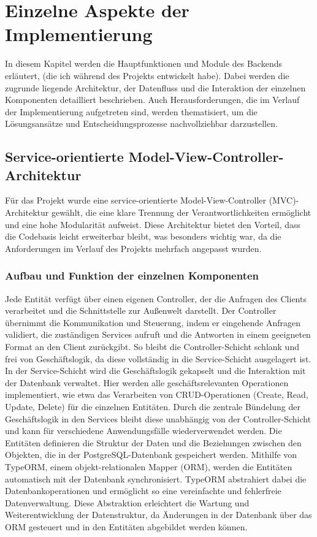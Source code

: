\chapter{Einzelne Aspekte der Implementierung}
In diesem Kapitel werden die Hauptfunktionen und Module des Backends erläutert, (die ich während des Projekts entwickelt habe). Dabei werden die zugrunde liegende Architektur, der Datenfluss und die Interaktion der einzelnen Komponenten detailliert beschrieben. Auch Herausforderungen, die im Verlauf der Implementierung aufgetreten sind, werden thematisiert, um die Lösungsansätze und Entscheidungsprozesse nachvollziehbar darzustellen.
\section{Service-orientierte Model-View-Controller-Architektur}
Für das Projekt wurde eine service-orientierte Model-View-Controller (MVC)-Architektur gewählt, die eine klare Trennung der Verantwortlichkeiten ermöglicht und eine hohe Modularität aufweist. Diese Architektur bietet den Vorteil, dass die Codebasis leicht erweiterbar bleibt, was besonders wichtig war, da die Anforderungen im Verlauf des Projekts mehrfach angepasst wurden.
\subsection*{Aufbau und Funktion der einzelnen Komponenten}
Jede Entität verfügt über einen eigenen Controller, der die Anfragen des Clients verarbeitet und die Schnittstelle zur Außenwelt darstellt. Der Controller übernimmt die Kommunikation und Steuerung, indem er eingehende Anfragen validiert, die zuständigen Services aufruft und die Antworten in einem geeigneten Format an den Client zurückgibt. So bleibt die Controller-Schicht schlank und frei von Geschäftslogik, da diese vollständig in die Service-Schicht ausgelagert ist.
\newline
In der Service-Schicht wird die Geschäftslogik gekapselt und die Interaktion mit der Datenbank verwaltet. Hier werden alle geschäftsrelevanten Operationen implementiert, wie etwa das Verarbeiten von CRUD-Operationen (Create, Read, Update, Delete) für die einzelnen Entitäten. Durch die zentrale Bündelung der Geschäftslogik in den Services bleibt diese unabhängig von der Controller-Schicht und kann für verschiedene Anwendungsfälle wiederverwendet werden.
\newline
Die Entitäten definieren die Struktur der Daten und die Beziehungen zwischen den Objekten, die in der PostgreSQL-Datenbank gespeichert werden. Mithilfe von TypeORM, einem objekt-relationalen Mapper (ORM), werden die Entitäten automatisch mit der Datenbank synchronisiert. TypeORM abstrahiert dabei die Datenbankoperationen und ermöglicht so eine vereinfachte und fehlerfreie Datenverwaltung. Diese Abstraktion erleichtert die Wartung und Weiterentwicklung der Datenstruktur, da Änderungen in der Datenbank über das ORM gesteuert und in den Entitäten abgebildet werden können.

